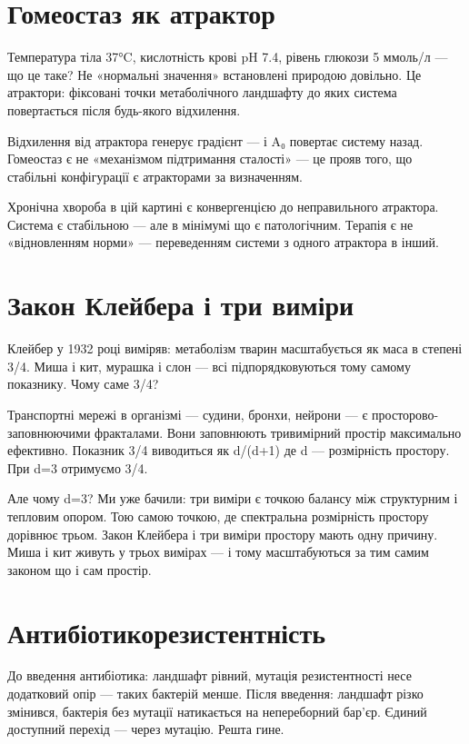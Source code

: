 \documentclass[12pt, a4paper, openany]{book}
\begin{document}
\section{Гомеостаз як атрактор}

Температура тіла 37°C, кислотність крові pH 7.4, рівень глюкози 5 ммоль/л — що це таке? Не «нормальні значення» встановлені природою довільно. Це атрактори: фіксовані точки метаболічного ландшафту до яких система повертається після будь-якого відхилення.

Відхилення від атрактора генерує градієнт — і A₀ повертає систему назад. Гомеостаз є не «механізмом підтримання сталості» — це прояв того, що стабільні конфігурації є атракторами за визначенням.

Хронічна хвороба в цій картині є конвергенцією до неправильного атрактора. Система є стабільною — але в мінімумі що є патологічним. Терапія є не «відновленням норми» — переведенням системи з одного атрактора в інший.

\section{Закон Клейбера і три виміри}

Клейбер у 1932 році виміряв: метаболізм тварин масштабується як маса в степені 3/4. Миша і кит, мурашка і слон — всі підпорядковуються тому самому показнику. Чому саме 3/4?

Транспортні мережі в організмі — судини, бронхи, нейрони — є просторово-заповнюючими фракталами. Вони заповнюють тривимірний простір максимально ефективно. Показник 3/4 виводиться як d/(d+1) де d — розмірність простору. При d=3 отримуємо 3/4.

Але чому d=3? Ми уже бачили: три виміри є точкою балансу між структурним і тепловим опором. Тою самою точкою, де спектральна розмірність простору дорівнює трьом. Закон Клейбера і три виміри простору мають одну причину. Миша і кит живуть у трьох вимірах — і тому масштабуються за тим самим законом що і сам простір.

\section{Антибіотикорезистентність}

До введення антибіотика: ландшафт рівний, мутація резистентності несе додатковий опір — таких бактерій менше. Після введення: ландшафт різко змінився, бактерія без мутації натикається на непереборний бар'єр. Єдиний доступний перехід — через мутацію. Решта гине.
\end{document}
